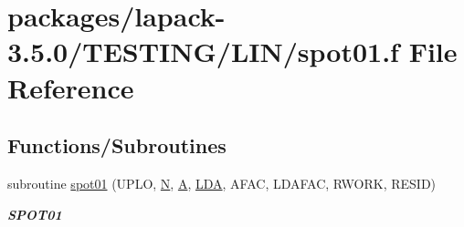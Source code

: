 \hypertarget{spot01_8f}{}\section{packages/lapack-\/3.5.0/\+T\+E\+S\+T\+I\+N\+G/\+L\+I\+N/spot01.f File Reference}
\label{spot01_8f}
\subsection*{Functions/\+Subroutines}
\begin{DoxyCompactItemize}
\item 
subroutine \hyperlink{group__single__lin_ga1dbca454e3ec45506f2f435e34b5960f}{spot01} (U\+P\+L\+O, \hyperlink{polmisc_8c_a0240ac851181b84ac374872dc5434ee4}{N}, \hyperlink{classA}{A}, \hyperlink{example__user_8c_ae946da542ce0db94dced19b2ecefd1aa}{L\+D\+A}, A\+F\+A\+C, L\+D\+A\+F\+A\+C, R\+W\+O\+R\+K, R\+E\+S\+I\+D)
\begin{DoxyCompactList}\small\item\em {\bfseries S\+P\+O\+T01} \end{DoxyCompactList}\end{DoxyCompactItemize}
